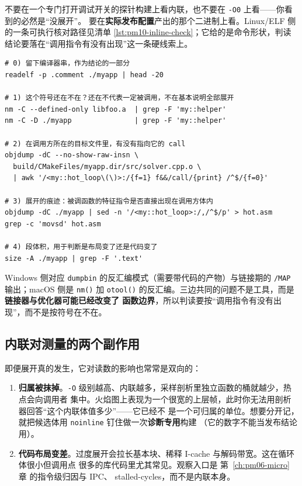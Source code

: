 \documentclass[12pt,a4paper,fontset=fandol]{ctexbook}
\newcommand{\Fn}[1]{\texttt{#1()}}
\newcommand{\Tp}[1]{\texttt{#1}}
\newcommand{\Mx}[1]{\textsf{#1}}
\begin{document}
不要在一个专门打开调试开关的探针构建上看内联，也不要在 \Tp{-O0} 上看——你看到的必然是``没展开''。
要在\textbf{实际发布配置}产出的那个二进制上看。Linux/ELF 侧的一条可执行核对路径见清单
\ref{lst:pm10-inline-check}；它给的是命令形状，判读结论要落在``调用指令有没有出现''这一条硬线索上。

\begin{lstlisting}[style=shellstyle,title={在发布产物上核对展开与调用点（骨架，非本仓库实测）},label={lst:pm10-inline-check}]
# 0) 留下编译器串，作为结论的一部分
readelf -p .comment ./myapp | head -20

# 1) 这个符号还在不在？还在不代表一定被调用，不在基本说明全部展开
nm -C --defined-only libfoo.a  | grep -F 'my::helper'
nm -C -D ./myapp               | grep -F 'my::helper'

# 2) 在调用方所在的目标文件里，有没有指向它的 call
objdump -dC --no-show-raw-insn \
  build/CMakeFiles/myapp.dir/src/solver.cpp.o \
  | awk '/<my::hot_loop\(\)>:/{f=1} f&&/call/{print} /^$/{f=0}'

# 3) 展开的痕迹：被调函数的特征指令是否直接出现在调用方体内
objdump -dC ./myapp | sed -n '/<my::hot_loop>:/,/^$/p' > hot.asm
grep -c 'movsd' hot.asm

# 4) 段体积，用于判断是布局变了还是代码变了
size -A ./myapp | grep -F '.text'
\end{lstlisting}

Windows 侧对应 \Tp{dumpbin} 的反汇编模式（需要带代码的产物）与链接期的 \Tp{/MAP} 输出；macOS 侧是
\Fn{nm} 加 \Fn{otool} 的反汇编。三边共同的问题不是工具，而是\textbf{链接器与优化器可能已经改变了
函数边界}，所以判读要按``调用指令有没有出现''，而不是按符号在不在。

\subsection{内联对测量的两个副作用}

即便展开真的发生，它对读数的影响也常常是双向的：

\begin{enumerate}
  \item \textbf{归属被抹掉}。\Tp{-O} 级别越高、内联越多，采样剖析里独立函数的桶就越少，热点会向调用者
        集中。火焰图上表现为一个很宽的上层帧，此时你无法用剖析器回答``这个内联体值多少''——它已经不
        是一个可归属的单位。想要分开记，就把候选体用 \Tp{noinline} 钉住做一次\textbf{诊断专用}构建
        （它的数字不能当发布结论用）。
  \item \textbf{代码布局变差}。过度展开会拉长基本块、稀释 I-cache 与解码带宽。这在循环体很小但调用点
        很多的库代码里尤其常见。观察入口是 第~\ref{ch:pm06-micro} 章 的指令级归因与 \Mx{IPC}、
        \Mx{stalled-cycles}，而不是内联本身。
\end{enumerate}
\end{document}
